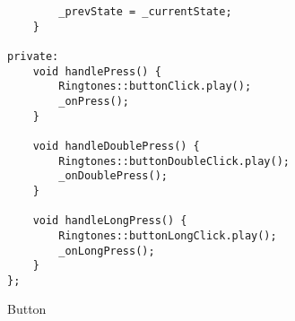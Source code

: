 \begin{code}
\begin{verbatim}
        _prevState = _currentState;
    }

private:
    void handlePress() {
        Ringtones::buttonClick.play();
        _onPress();
    }

    void handleDoublePress() {
        Ringtones::buttonDoubleClick.play();
        _onDoublePress();
    }

    void handleLongPress() {
        Ringtones::buttonLongClick.play();
        _onLongPress();
    }
};
\end{verbatim}
\caption{Button}
\end{code}
